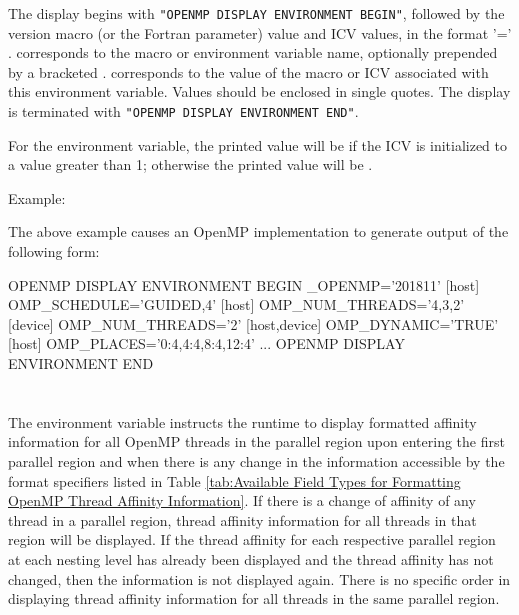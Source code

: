 The display begins with \texttt{"OPENMP DISPLAY ENVIRONMENT BEGIN"}, followed by
the  version macro (or the  Fortran parameter) value and
ICV values, in the format  '=' .  corresponds to the macro or
environment variable name, optionally prepended by a bracketed . 
corresponds to the value of the macro or ICV associated with this environment variable.
Values should be enclosed in single quotes. The display is terminated with
\texttt{"OPENMP DISPLAY ENVIRONMENT END"}.

For the  environment variable, the printed value will
be  if the  ICV is initialized to a
value greater than 1; otherwise the printed value will be .

Example:
\begin{ompEnv}
\end{ompEnv}

The above example causes an OpenMP implementation to generate output of the
following form:

\begin{ompEnv}
OPENMP DISPLAY ENVIRONMENT BEGIN
  _OPENMP='201811'
  [host] OMP_SCHEDULE='GUIDED,4'
  [host] OMP_NUM_THREADS='4,3,2'
  [device] OMP_NUM_THREADS='2'
  [host,device] OMP_DYNAMIC='TRUE'
  [host] OMP_PLACES='{0:4},{4:4},{8:4},{12:4}'
  ...
OPENMP DISPLAY ENVIRONMENT END
\end{ompEnv}


\section{}
\label{sec:OMP_DISPLAY_AFFINITY}

The  environment variable instructs the runtime to
display formatted affinity information for all OpenMP threads in the parallel
region upon entering the first parallel region and when there is any change in
the information accessible by the format specifiers listed in Table
\ref{tab:Available Field Types for Formatting OpenMP Thread Affinity Information}.
If there is a change of affinity of any thread in a parallel region, thread
affinity information for all threads in that region will be displayed.
If the thread affinity for each respective parallel region at each nesting level
has already been displayed and the thread affinity has not changed, then the
information is not displayed again.
There is no specific order in displaying thread affinity information for all
threads in the same parallel region.

